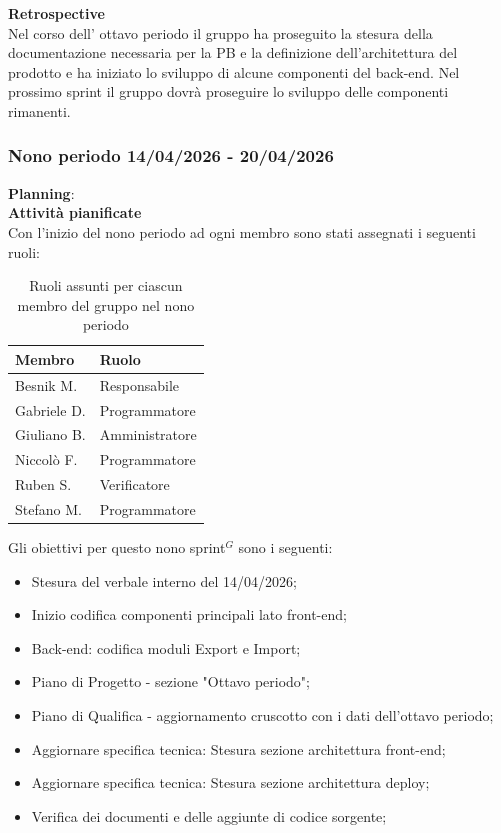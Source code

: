 \documentclass[a4paper,10pt]{article}
\begin{document}
\textbf{Retrospective} \\
Nel corso dell' ottavo periodo il gruppo ha proseguito la stesura della documentazione necessaria per la PB e la definizione dell'architettura del prodotto e ha iniziato lo sviluppo di alcune componenti del back-end.
Nel prossimo sprint il gruppo dovrà proseguire lo sviluppo delle componenti rimanenti.

\subsubsection{Nono periodo 14/04/2026 - 20/04/2026}
\textbf{Planning}: \\
\textbf{Attività pianificate} \\ Con l'inizio del nono periodo ad ogni membro sono stati assegnati i seguenti ruoli:
\begin{table}[H]
\centering
\begin{tabular}{|l|l|}
\hline
\textbf{Membro} & \textbf{Ruolo} \\
\hline
Besnik M.  & Responsabile \\
\hline
Gabriele D.  & Programmatore \\
\hline
Giuliano B. & Amministratore \\
\hline
Niccolò F. & Programmatore \\
\hline
Ruben S. & Verificatore \\
\hline
Stefano M.  & Programmatore \\
\hline
\end{tabular}
\caption{Ruoli assunti per ciascun membro del gruppo nel nono periodo}
\end{table}

Gli obiettivi per questo nono sprint$^G$ sono i seguenti:
\begin{itemize}
  \item Stesura del verbale interno del 14/04/2026;
  \item Inizio codifica componenti principali lato front-end;
  \item Back-end: codifica moduli Export e Import;
  \item Piano di Progetto - sezione "Ottavo periodo";
  \item Piano di Qualifica - aggiornamento cruscotto con i dati dell'ottavo periodo;
  \item Aggiornare specifica tecnica: Stesura sezione architettura front-end;
  \item Aggiornare specifica tecnica: Stesura sezione architettura deploy;
  \item Verifica dei documenti e delle aggiunte di codice sorgente;
\end{itemize}
\end{document}
